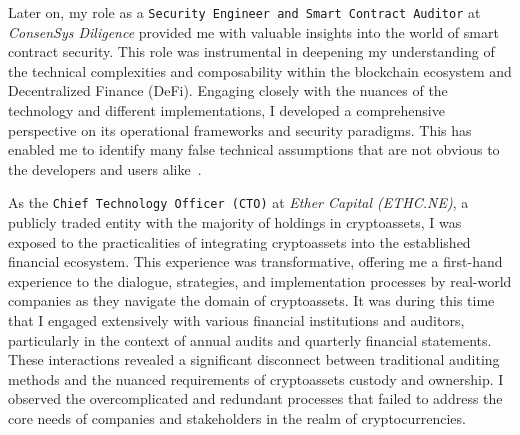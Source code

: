 Later on, my role as a \texttt{Security Engineer and Smart Contract Auditor} at \textit{ConsenSys Diligence} provided me with valuable insights into the world of smart contract security. This role was instrumental in deepening my understanding of the technical complexities and composability within the blockchain ecosystem and Decentralized Finance (DeFi). Engaging closely with the nuances of the technology and different implementations, I developed a comprehensive perspective on its operational frameworks and security paradigms. This has enabled me to identify many false technical assumptions that are not obvious to the developers and users alike~\cite{shayantokenChecklist,shayanENSaudit}. 


As the \texttt{Chief Technology Officer (CTO)} at \textit{Ether Capital (ETHC.NE)}, a publicly traded entity with the majority of holdings in cryptoassets, I was exposed to the practicalities of integrating cryptoassets into the established financial ecosystem. This experience was transformative, offering me a first-hand experience to the dialogue, strategies, and implementation processes by real-world companies as they navigate the domain of cryptoassets. It was during this time that I engaged extensively with various financial institutions and auditors, particularly in the context of annual audits and quarterly financial statements. These interactions revealed a significant disconnect between traditional auditing methods and the nuanced requirements of cryptoassets custody and ownership. I observed the overcomplicated and redundant processes that failed to address the core needs of companies and stakeholders in the realm of cryptocurrencies.

        
        
        
